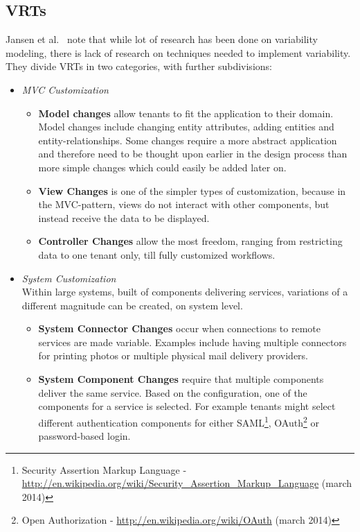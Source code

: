 \subsection{\aclp{VRT}}
\label{sec:vrt}
Jansen et al.~\cite{jansen2010customization} note that while lot of research has been done on variability modeling, there is lack of research on techniques needed to implement variability. They divide \acp{VRT} in two categories, with further subdivisions:
\begin{itemize}
\item \textit{\ac{MVC} Customization}
\begin{itemize}
\item \textbf{Model changes} allow tenants to fit the application to their domain. Model changes include changing entity attributes, adding entities and entity-relationships. Some changes require a more abstract application and therefore need to be thought upon earlier in the design process than more simple changes which could easily be added later on.
\item \textbf{View Changes} is one of the simpler types of customization, because in the \ac{MVC}-pattern, views do not interact with other components, but instead receive the data to be displayed.
\item \textbf{Controller Changes} allow the most freedom, ranging from restricting data to one tenant only, till fully customized workflows.
\end{itemize}
\item \textit{System Customization} \\ Within large systems, built of components delivering services, variations of a different magnitude can be created, on system level.
\begin{itemize}
\item \textbf{System Connector Changes} occur when connections to remote services are made variable. Examples include having multiple connectors for printing photos or multiple physical mail delivery providers.
\item \textbf{System Component Changes} require that multiple components deliver the same service. Based on the configuration, one of the components for a service is selected. For example tenants might select different authentication components for either SAML\footnote{Security Assertion Markup Language - \url{http://en.wikipedia.org/wiki/Security_Assertion_Markup_Language} (march 2014)}, OAuth\footnote{Open Authorization - \url{http://en.wikipedia.org/wiki/OAuth} (march 2014)} or password-based login.
\end{itemize}
\end{itemize}


